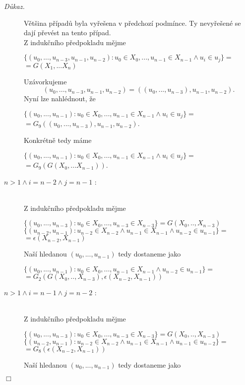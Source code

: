 \documentclass[12pt,a4paper]{article}
\newenvironment{proof}
{\noindent \textit{D\r{u}kaz.}}
{\hspace*{\fill} $\Box$}
\begin{document}
\begin{proof}
\begin{description}
V\v{e}t\v{s}ina p\v{r}\'{i}pad\r{u} byla vy\v{r}e\v{s}ena v p\v{r}edchoz\'{i} podm\'{i}nce. Ty nevy\v{r}e\v{s}en\'{e} se daj\'{i} p\v{r}ev\'{e}st na tento p\v{r}\'{i}pad. \\
Z induk\v{c}n\'{i}ho p\v{r}edpokladu m\v{e}jme
 \begin{center}
 $ \{(u_0 ,...,u_{n-3},u_{n-1}, u_{n-2} ): u_0 \in  X_0,...,  u_{n-1}  \in  X_{n-1}  \wedge  u_i \in  u_j \}= $ $ =G(X_1,...X_{n})  $
 \end{center} 
Uz\'{a}vorkujeme 
\[ (u_0 ,...,u_{n-3},u_{n-1}, u_{n-2})= ((u_0 ,...,u_{n-3}),u_{n-1}, u_{n-2}) .\]
Nyn\'{i} lze nahl\'{e}dnout, \v{z}e\begin{center}
  $\{(u_0 ,..., u_{n-1}) : u_0 \in  X_0,...,u_{n-1}  \in  X_{n-1} \wedge  u_i \in  u_j \}=$ $=G_9((u_0 ,...,u_{n-3}),u_{n-1}, u_{n-2}) $.
 \end{center}
Konkr\'{e}tn\v{e} tedy m\'{a}me
\begin{center}
$ \{(u_0 ,..., u_{n-1}) : u_0 \in  X_0,...,u_{n-1}  \in  X_{n-1}  \wedge  u_i \in  u_j \}=$ $=G_9(G(X_0,...X_{n-1})) $.
\end{center}
\item[$ n > 1 \wedge i= n-2 \wedge j = n-1 $ :]~\\
Z induk\v{c}n\'{i}ho p\v{r}edpokladu m\v{e}jme
\begin{center}
$ \{(u_0 ,..., u_{n-3}) : u_0 \in  X_0,...,u_{n-3}  \in  X_{n-3}\}= G(X_0,..,X_{n-3})$ \\
$ \{(u_{n-2} , u_{n-1}) : u_{n-2} \in  X_{n-2} \wedge  u_{n-1} \in  X_{n-1} \wedge  u_{n-2} \in  u_{n-1} \}=$ $=\epsilon(X_{n-2},X_{n-1})$ 
\end{center}
Na\v{s}\'{i} hledanou $ (u_0 ,..., u_{n-1}) $ tedy dostaneme jako
\begin{center}
  $\{(u_0 ,..., u_{n-1}) : u_0 \in  X_0,...,u_{n-1}  \in  X_{n-1} \wedge  u_{n-2} \in  u_{n-1}  \} = $ 
$=G_2(G(X_0,..,X_{n-3}),\epsilon(X_{n-2},X_{n-1}))$
 \end{center}
\item[$ n > 1 \wedge i= n-1 \wedge j = n-2 $ :]~\\
Z induk\v{c}n\'{i}ho p\v{r}edpokladu m\v{e}jme
\begin{center}
$ \{(u_0 ,..., u_{n-3}) : u_0 \in  X_0,...,u_{n-3}  \in  X_{n-3}\}= G(X_0,..,X_{n-3})$ \\
$ \{(u_{n-2} , u_{n-1}) : u_{n-2} \in  X_{n-2} \wedge  u_{n-1} \in  X_{n-1} \wedge  u_{n-1} \in  u_{n-2} \}=$ $=G_8(\epsilon(X_{n-2},X_{n-1}))$ 
\end{center}
Na\v{s}\'{i} hledanou $ (u_0 ,..., u_{n-1}) $ tedy dostaneme jako

\end{description}
\end{proof}
\end{document}
